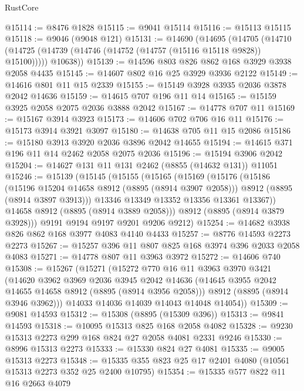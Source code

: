 \begin{lexlean}{RustCore}
\begin{coremodule}
@15114 := @8476 @1828
@15115 := @9041 @15114
@15116 := @15113 @15115
@15118 := @9046 (@9048 @121)
@15131 := @14690
    (@14695
      (@14705
        (@14710 (@14725 (@14739 (@14746 (@14752 (@14757 (@15116 @15118 @9828)) @15100)))))
        @10638))
@15139 := @14596 @803 @826 @862 @168 @3929 @3938 @2058 @4435
@15145 := @14607 @802 @16 @25 @3929 @3936 @2122
@15149 := @14616 @801 @11 @15 @2339
@15155 := @15149 @3928 @3935 @2036 @3878 @2042 @14636
@15159 := @14615 @707 @196 @11 @14
@15165 := @15159 @3925 @2058 @2075 @2036 @3888 @2042
@15167 := @14778 @707 @11
@15169 := @15167 @3914 @3923
@15173 := @14606 @702 @706 @16 @11
@15176 := @15173 @3914 @3921 @3097
@15180 := @14638 @705 @11 @15 @2086
@15186 := @15180 @3913 @3920 @2036 @3896 @2042 @14655
@15194 := @14615 @371 @196 @11 @14 @2462 @2058 @2075 @2036
@15196 := @15194 @3906 @2042
@15204 := @14627 @131 @11 @131 @2462 (@8855 (@14632 @131)) @11051
@15246 := @15139
    (@15145
      (@15155
        (@15165
          (@15169
            (@15176
              (@15186
                (@15196 @15204 @14658 @8912 (@8895 (@8914 @3907 @2058)))
                @8912
                (@8895 (@8914 @3897 @3913)))
              @13346
              @13349
              @13352
              @13356
              @13361
              @13367))
          @14658
          @8912
          (@8895 (@8914 @3889 @2058)))
        @8912
        (@8895 (@8914 @3879 @3928)))
      @9191
      @9194
      @9197
      @9201
      @9206
      @9212)
@15254 := @14682 @3938 @826 @862 @168 @3977 @4083 @4140 @4433
@15257 := @8776 @14593 @2273 @2273
@15267 := @15257 @396 @11 @807 @825 @168 @3974 @396 @2033 @2058 @4083
@15271 := @14778 @807 @11 @3963 @3972
@15272 := @14606 @740
@15308 := @15267
    (@15271
      (@15272
        @770
        @16
        @11
        @3963
        @3970
        @3421
        (@14620
          @3962
          @3969
          @2036
          @3945
          @2042
          @14636
          (@14645 @3955 @2042 @14655 @14658 @8912 (@8895 (@8914 @3956 @2058)))
          @8912
          (@8895 (@8914 @3946 @3962)))
        @14033
        @14036
        @14039
        @14043
        @14048
        @14054))
@15309 := @9081 @14593
@15312 := @15308 (@8895 (@15309 @396))
@15313 := @9841 @14593
@15318 := @10095 @15313 @825 @168 @2058 @4082
@15328 := @9230 @15313 @2273 @299 @168 @824 @27 @2058 @4081 @2331 @9246
@15330 := @8996 @15313 @2273
@15333 := @15330 @824 @27 @4081
@15335 := @9005 @15313 @2273
@15348 := @15335 @355 @823 @25 @17 @2401 @4080 (@10561 @15313 @2273 @352 @25 @2400 @10795)
@15354 := @15335 @577 @822 @11 @16 @2663 @4079

\end{coremodule}
\end{lexlean}
